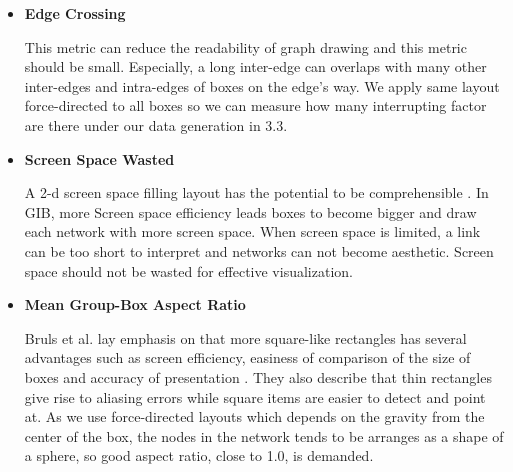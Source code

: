 \documentclass{llncs}
\begin{document}
\begin{itemize}
\item {\bf Edge Crossing}

This metric can reduce the readability of graph drawing and this metric should be small.
Especially, a long inter-edge can overlaps with many other inter-edges and intra-edges of boxes on the edge's way.
We apply same layout force-directed to all boxes so we can measure how many interrupting factor are there under our data generation in 3.3.


\item {\bf Screen Space Wasted}

A 2-d screen space filling layout has the potential to be comprehensible \cite{shn92}.
In GIB, more Screen space efficiency leads boxes to become bigger and draw each network with more screen space.
When screen space is limited, a link can be too short to interpret and networks can not become aesthetic.
Screen space should not be wasted for effective visualization.


\item {\bf Mean Group-Box Aspect Ratio}

Bruls et al. lay emphasis on that more square-like rectangles has several advantages such as screen efficiency, easiness of comparison of the size of boxes and accuracy of presentation \cite{bruls}.
They also describe that thin rectangles give rise to aliasing errors while square items are easier to detect and point at.
As we use force-directed layouts which depends on the gravity from the center of the box, the nodes in the network tends to be arranges as a shape of a sphere, so good aspect ratio, close to 1.0, is demanded.
\end{itemize}
\end{document}
